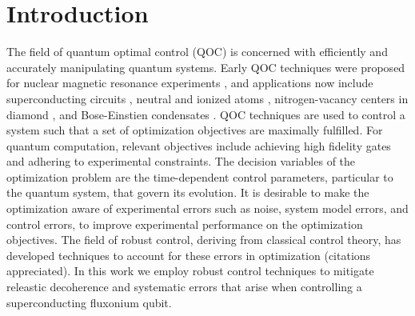 \documentclass[
  amsfonts,
  amsmath,
  tbtags,
  amssymb,
  aps,
  nobibnotes,
  twocolumn,
  superscriptaddress,
]{revtex4-2}
\begin{document}
\maketitle


\section{Introduction}
The field of quantum optimal control (QOC) is concerned
with efficiently and accurately manipulating quantum systems.
Early QOC techniques were proposed for nuclear magnetic resonance experiments
\cite{khaneja2005optimal}, and applications now include superconducting
circuits \cite{heeres2017implementing,
  leng2019robust, leung2017speedup, xu2020nonadiabatic},
neutral and ionized atoms \cite{van2016optimal}, nitrogen-vacancy centers in
diamond \cite{rembold2020introduction}, and Bose-Einstien condensates
\cite{sorensen2018quantum}. QOC techniques are used to
control a system such that a set of optimization objectives are maximally fulfilled.
For quantum computation, relevant objectives include achieving high fidelity
gates and adhering to experimental constraints.
The decision variables of the optimization problem are the time-dependent control
parameters, particular to the quantum system, that govern its evolution.
It is desirable to make the optimization aware of experimental errors
such as noise, system model errors, and control errors, to
improve experimental performance on the optimization objectives.
The field of robust control, deriving from classical control theory, has developed
techniques to account for these errors in optimization (citations appreciated).
In this work we employ robust control techniques to mitigate
releastic decoherence and systematic errors that arise when controlling
a superconducting fluxonium qubit.
\end{document}
